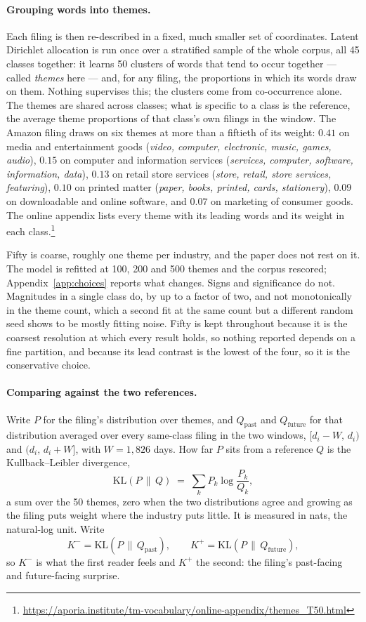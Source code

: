 \paragraph{Grouping words into themes.} Each filing is then re-described in a
fixed, much smaller set of coordinates. Latent Dirichlet allocation is run
once over a stratified sample of the whole corpus, all 45 classes together: it
learns 50 clusters of words that tend to occur together --- called
\emph{themes} here --- and, for any filing, the proportions in which its words
draw on them. Nothing supervises this; the clusters come from co-occurrence
alone. The themes are shared across classes; what is specific to a class is
the reference, the average theme proportions of that class's own filings in
the window. The Amazon filing draws on six themes at more than a fiftieth of
its weight: $0.41$ on media and entertainment goods (\emph{video, computer,
electronic, music, games, audio}), $0.15$ on computer and information services
(\emph{services, computer, software, information, data}), $0.13$ on retail
store services (\emph{store, retail, store services, featuring}), $0.10$ on
printed matter (\emph{paper, books, printed, cards, stationery}), $0.09$ on
downloadable and online software, and $0.07$ on marketing of consumer goods.
The online appendix lists every theme with its leading words and its weight in
each class.\footnote{\url{https://aporia.institute/tm-vocabulary/online-appendix/themes_T50.html}}

Fifty is coarse, roughly one theme per industry, and the paper does not rest
on it. The model is refitted at 100, 200 and 500 themes and the corpus
rescored; Appendix~\ref{app:choices} reports what changes. Signs and
significance do not. Magnitudes in a single class do, by up to a factor of
two, and not monotonically in the theme count, which a second fit at the same
count but a different random seed shows to be mostly fitting noise. Fifty is
kept throughout because it is the coarsest resolution at which every result
holds, so nothing reported depends on a fine partition, and because its lead
contrast is the lowest of the four, so it is the conservative choice.

\paragraph{Comparing against the two references.} Write $P$ for the filing's
distribution over themes, and $Q_{\mathrm{past}}$ and $Q_{\mathrm{future}}$
for that distribution averaged over every same-class filing in the two
windows, $[d_i - W,\, d_i)$ and $(d_i,\, d_i + W]$, with $W = 1{,}826$ days.
How far $P$ sits from a reference $Q$ is the Kullback--Leibler divergence,
\[
  \mathrm{KL}(P \,\|\, Q) \;=\; \sum_{k} P_k \log \frac{P_k}{Q_k},
\]
a sum over the 50 themes, zero when the two distributions agree and growing as
the filing puts weight where the industry puts little. It is measured in nats,
the natural-log unit. Write
\[
  K^{-} = \mathrm{KL}(P \,\|\, Q_{\mathrm{past}}),
  \qquad
  K^{+} = \mathrm{KL}(P \,\|\, Q_{\mathrm{future}}),
\]
so $K^{-}$ is what the first reader feels and $K^{+}$ the second: the
filing's past-facing and future-facing surprise.

